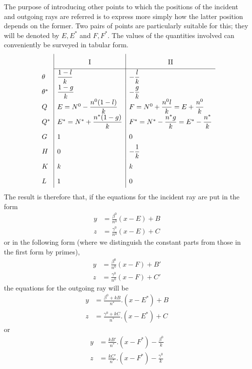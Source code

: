 The purpose of introducing other points to which the positions of the incident and outgoing rays are referred is to express more simply how the latter position depends on the former. Two pairs of points are particularly suitable for this; they will be denoted by $E,E^*$ and $F,F^*$. The values of the quantities involved can conveniently be surveyed in tabular form.
\[
\renewcommand{\arraystretch}{1.8}
\begin{array}{l|l|l}
&\multicolumn{1}{c|}{\mathrm{I}}&\multicolumn{1}{c}{\mathrm{II}}\\\cline{2-3}
\theta&\dfrac{1-l}{k}&-\dfrac{l}{k}\\
\theta^*&\dfrac{1-g}{k}&-\dfrac{g}{k}\\
Q&E=N^0-\dfrac{n^0(1-l)}{k}&F=N^0+\dfrac{n^0l}{k}=E+\dfrac{n^0}{k}\\
Q^*&E^*=N^*+\dfrac{n^*(1-g)}{k}&F^*=N^*-\dfrac{n^*g}{k}=E^*-\dfrac{n^*}{k}\\
G&1&0\\
H&0&-\dfrac1k\\
K&k&k\\
L&1&0
\end{array}
\]
The result is therefore that, if the equations for the incident ray are put in the form
\[
\begin{aligned}
y&=\frac{\beta^0}{n^0}(x-E)+B\\
z&=\frac{\gamma^0}{n^0}(x-E)+C
\end{aligned}
\]
or in the following form (where we distinguish the constant parts from those in the first form by primes),
\[
\begin{aligned}
y&=\frac{\beta^0}{n^0}(x-F)+B'\\
z&=\frac{\gamma^0}{n^0}(x-F)+C'
\end{aligned}
\]
the equations for the outgoing ray will be
\[
\begin{aligned}
y&=\frac{\beta^0+kB}{n^*}.(x-E^*)+B\\
z&=\frac{\gamma^0+kC}{n^*}.(x-E^*)+C
\end{aligned}
\]
or
\[
\begin{aligned}
y&=\frac{kB'}{n^*}.(x-F^*)-\frac{\beta^0}k\\
z&=\frac{kC'}{n^*}.(x-F^*)-\frac{\gamma^0}k
\end{aligned}
\]

